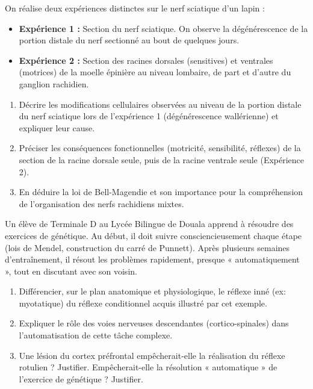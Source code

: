 \documentclass[11pt]{article}
\begin{document}
\begin{exercice}
On réalise deux expériences distinctes sur le nerf sciatique d'un lapin :
\begin{itemize}
    \item \textbf{Expérience 1 :} Section du nerf sciatique. On observe la dégénérescence de la portion distale du nerf sectionné au bout de quelques jours.
    \item \textbf{Expérience 2 :} Section des racines dorsales (sensitives) et ventrales (motrices) de la moelle épinière au niveau lombaire, de part et d'autre du ganglion rachidien.
\end{itemize}
\begin{enumerate}
    \item Décrire les modifications cellulaires observées au niveau de la portion distale du nerf sciatique lors de l'expérience 1 (dégénérescence wallérienne) et expliquer leur cause.
    \item Préciser les conséquences fonctionnelles (motricité, sensibilité, réflexes) de la section de la racine dorsale seule, puis de la racine ventrale seule (Expérience 2).
    \item En déduire la loi de Bell-Magendie et son importance pour la compréhension de l'organisation des nerfs rachidiens mixtes.
\end{enumerate}
\end{exercice}

\begin{exercice}
Un élève de Terminale D au Lycée Bilingue de Douala apprend à résoudre des exercices de génétique. Au début, il doit suivre consciencieusement chaque étape (lois de Mendel, construction du carré de Punnett). Après plusieurs semaines d'entraînement, il résout les problèmes rapidement, presque « automatiquement », tout en discutant avec son voisin.
\begin{enumerate}
    \item Différencier, sur le plan anatomique et physiologique, le réflexe inné (ex: myotatique) du réflexe conditionnel acquis illustré par cet exemple.
    \item Expliquer le rôle des voies nerveuses descendantes (cortico-spinales) dans l'automatisation de cette tâche complexe.
    \item Une lésion du cortex préfrontal empêcherait-elle la réalisation du réflexe rotulien ? Justifier. Empêcherait-elle la résolution « automatique » de l'exercice de génétique ? Justifier.
\end{enumerate}
\end{exercice}
\end{document}
